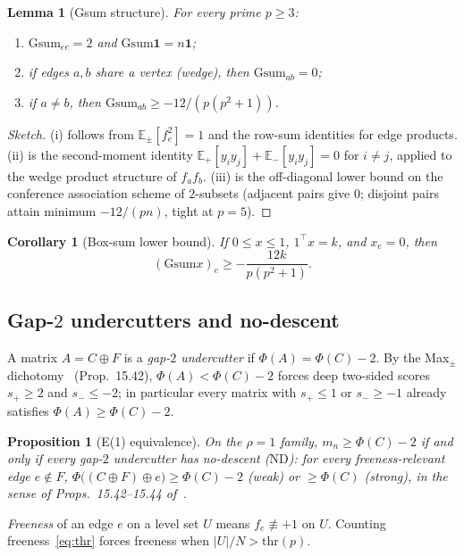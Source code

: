 \documentclass[11pt,a4paper]{article}
\theoremstyle{plain}
\newtheorem{lemma}[theorem]{Lemma}
\newtheorem{proposition}[theorem]{Proposition}
\newtheorem{corollary}[theorem]{Corollary}
\theoremstyle{definition}
\newcommand{\Gsum}{\mathrm{Gsum}}
\newcommand{\thr}{\mathrm{thr}}
\newcommand{\ND}{\ensuremath{\mathrm{ND}}}
\newcommand{\ES}{\mathbb{E}}
\begin{document}
\begin{lemma}[Gsum structure]
\label{lem:gsum}
For every prime $p\ge3$:
\begin{enumerate}[label=(\roman*)]
\item $\Gsum_{ee}=2$ and $\Gsum\mathbf{1}=n\mathbf{1}$;
\item if edges $a,b$ share a vertex (wedge), then $\Gsum_{ab}=0$;
\item if $a\neq b$, then $\Gsum_{ab}\ge -12/(p(p^2+1))$.
\end{enumerate}
\end{lemma}

\begin{proof}[Sketch]
(i) follows from $\ES_\pm[f_e^2]=1$ and the row-sum identities for edge products.
(ii) is the second-moment identity $\ES_+[y_iy_j]+\ES_-[y_iy_j]=0$ for $i\neq j$, applied to
the wedge product structure of $f_a f_b$.
(iii) is the off-diagonal lower bound on the conference association scheme of $2$-subsets
(adjacent pairs give $0$; disjoint pairs attain minimum $-12/(pn)$, tight at $p=5$).
\end{proof}

\begin{corollary}[Box-sum lower bound]
\label{cor:box}
If $0\le x\le1$, $1^\top x=k$, and $x_e=0$, then
\[
(\Gsum x)_e\ge -\frac{12k}{p(p^2+1)}.
\]
\end{corollary}

\subsection{Gap-$2$ undercutters and no-descent}

A matrix $A=C\oplus F$ is a \emph{gap-$2$ undercutter} if $\Phi(A)=\Phi(C)-2$.
By the Max$_{\pm}$ dichotomy~\cite{solution-repo} (Prop.\ 15.42),
$\Phi(A)<\Phi(C)-2$ forces deep two-sided scores $s_+\ge2$ and $s_-\le-2$; in particular
every matrix with $s_+\le1$ or $s_-\ge-1$ already satisfies $\Phi(A)\ge\Phi(C)-2$.

\begin{proposition}[E(1) equivalence]
\label{prop:e1-equiv}
On the $\rho=1$ family, $m_n\ge\Phi(C)-2$ if and only if every gap-$2$ undercutter has
\emph{no-descent} (\ND): for every freeness-relevant edge $e\notin F$,
$\Phi\bigl((C\oplus F)\oplus e\bigr)\ge\Phi(C)-2$ (weak) or $\ge\Phi(C)$ (strong), in the
sense of Props.\ 15.42--15.44 of~\cite{solution-repo}.
\end{proposition}

\emph{Freeness} of an edge $e$ on a level set $U$ means $f_e\not\equiv+1$ on $U$.
Counting freeness~\eqref{eq:thr} forces freeness when $\lvert U\rvert/N>\thr(p)$.
\end{document}

